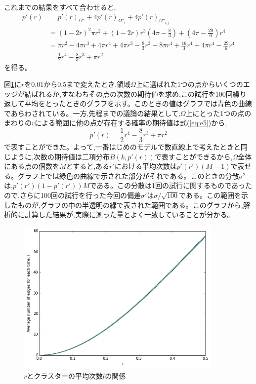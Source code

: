 これまでの結果をすべて合わせると,
\begin{align}
p'(r) &= p'(r)_{\Omega''} + 4p'(r)_{\Omega''_{i}} + 4p'(r)_{\Omega''_{i,j}}\nonumber \\
&= (1-2r)^{2}\pi r^{2} + (1-2r)r^{3}\left( 4\pi-\frac{8}{3} \right) + \left(4\pi -\frac{29}{6}\right)r^{4}\nonumber \\
&= \pi r^{2} - 4\pi r^{3} + 4\pi r^{4} + 4\pi r^{3} -\frac{8}{3}r^{3} - 8\pi r^{4} + \frac{16}{3}r^{4} + 4\pi r^{4} - \frac{29}{6}r^{4}\nonumber \\
&= \frac{1}{2}r^{4} -\frac{8}{3}r^{3} + \pi r^{2}
\label{eq:e5}
\end{align}
を得る。

図\ref{fig:f23}に$r$を$0.01$から$0.5$まで変えたとき,領域$\Omega$上に選ばれた1つの点からいくつのエッジが結ばれるか,すなわちその点の次数の期待値を求め,この試行を100回繰り返して平均をとったときのグラフを示す。このときの値はグラフでは青色の曲線であらわされている。一方,先程までの議論の結果として,$\Omega$上にとった1つの点のまわりの$r$による範囲に他の点が存在する確率の期待値は式(\ref{eq:e5})から,
\[p'(r) = \frac{1}{2}r^{4} -\frac{8}{3}r^{3} + \pi r^{2}\]
で表すことができた。よって,一番はじめのモデルで数直線上で考えたときと同じように,次数の期待値は二項分布$B(k,p'(r))$で表すことができるから,$\Omega$全体にある点の個数を$M$とすると,ある$r'$における平均次数は$p'(r')(M-1)$で表せる。グラフ上では緑色の曲線で示された部分がそれである。このときの分散$\sigma^{2}$は,$p'(r')(1-p'(r'))M$である。この分散は1回の試行に関するものであったので,さらに100回の試行を行った今回の偏差$\sigma'$は$\sigma/\sqrt{100}$である。この範囲を示したものが,グラフの中の半透明の緑で表された範囲である。このグラフから,解析的に計算した結果が,実際に測った量とよく一致していることが分かる。
\begin{figure}[H]
    \begin{center}
        \includegraphics[width=10cm]{../img/r_l.png}
        \caption{$r$とクラスターの平均次数$l$の関係}
        \label{fig:f23}
    \end{center}
\end{figure}

